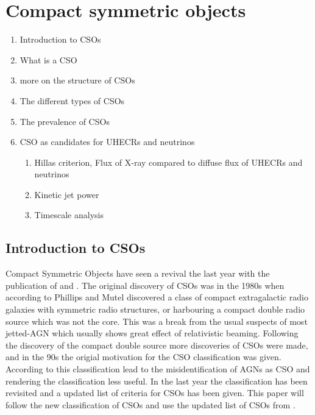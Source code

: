 \section{Compact symmetric objects}
\begin{enumerate}
    \item Introduction to CSOs
    \item What is a CSO
    \item more on the structure of CSOs
    \item The different types of CSOs
    \item The prevalence of CSOs 
    \item CSO as candidates for UHECRs and neutrinos
    \begin{enumerate}
        
       
        \item Hillas criterion, Flux of X-ray compared to diffuse flux of UHECRs and neutrinos 
        \item Kinetic jet power
        \item Timescale analysis
    \end{enumerate}
\end{enumerate}

\subsection*{Introduction to CSOs}

Compact Symmetric Objects have seen a revival the last year with the publication of \cite{kiehlmann2023compact} and \cite{readhead2023compact}. The original discovery of CSOs was in the 1980s when according to \cite{kiehlmann2023compact} Phillips and Mutel discovered a class of compact extragalactic radio galaxies with symmetric radio structures, or harbouring a compact double radio source which was not the core. This was a break from the usual suspects of most jetted-AGN which usually shows great effect of relativistic beaming. Following the discovery of the compact double source more discoveries of CSOs were made, and in the 90s the origial motivation for the CSO classification was given. According to \cite{kiehlmann2023compact} this classification lead to the misidentification of AGNs as CSO and rendering the classification less useful. In the last year the classification has been revisited and a updated list of criteria for CSOs has been given. This paper will follow the new classification of CSOs and use the updated list of CSOs from \cite{kiehlmann2023compact}.

